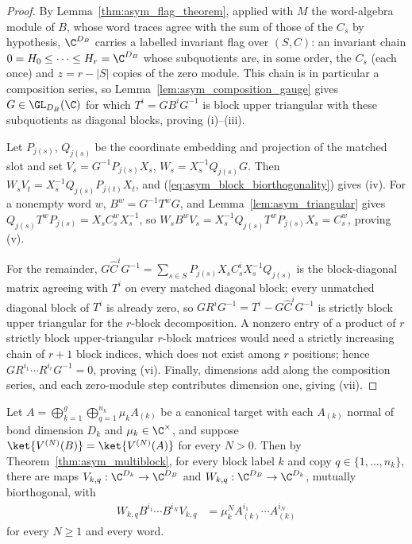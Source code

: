 \begin{proof}
    \leanok
    By Lemma~\ref{thm:asym_flag_theorem}, applied with $M$ the
    word-algebra module of $B$, whose word traces agree with the sum of
    those of the $C_s$ by hypothesis, $\C^{D_B}$ carries a labelled
    invariant flag over $(S,C)$: an invariant chain $0=H_0\leq\cdots\leq
        H_r=\C^{D_B}$ whose subquotients are, in some order, the $C_s$ (each
    once) and $z=r-|S|$ copies of the zero module. This chain is in
    particular a composition series, so Lemma~\ref{lem:asym_composition_gauge}
    gives $G\in\GL_{D_B}(\C)$ for which $T^i=GB^iG^{-1}$ is block upper
    triangular with these subquotients as diagonal blocks, proving (i)--(iii).

    Let $P_{j(s)}$, $Q_{j(s)}$ be the coordinate embedding and projection
    of the matched slot and set $V_s=G^{-1}P_{j(s)}X_s$,
    $W_s=X_s^{-1}Q_{j(s)}G$. Then $W_sV_t=X_s^{-1}Q_{j(s)}P_{j(t)}X_t$, and
    (\ref{eq:asym_block_biorthogonality}) gives (iv). For a nonempty word
    $w$, $B^w=G^{-1}T^wG$, and Lemma~\ref{lem:asym_triangular} gives
    $Q_{j(s)}T^wP_{j(s)}=X_sC_s^wX_s^{-1}$, so
    $W_sB^wV_s=X_s^{-1}Q_{j(s)}T^wP_{j(s)}X_s=C_s^w$, proving (v).

    For the remainder, $G\widehat C^iG^{-1}=\sum_{s\in S}P_{j(s)}X_sC_s^iX_s^{-1}Q_{j(s)}$
    is the block-diagonal matrix agreeing with $T^i$ on every matched
    diagonal block; every unmatched diagonal block of $T^i$ is already
    zero, so $GR^iG^{-1}=T^i-G\widehat C^iG^{-1}$ is strictly block upper
    triangular for the $r$-block decomposition. A nonzero entry of a
    product of $r$ strictly block upper-triangular $r$-block matrices would
    need a strictly increasing chain of $r+1$ block indices, which does not
    exist among $r$ positions; hence $GR^{i_1}\cdots R^{i_r}G^{-1}=0$,
    proving (vi). Finally, dimensions add along the composition series, and
    each zero-module step contributes dimension one, giving (vii).
\end{proof}

\begin{lemma}
    \label{thm:asym_weighted_compression}
    \leanok
    Let $A=\bigoplus_{k=1}^g\bigoplus_{q=1}^{n_k}\mu_kA_{(k)}$ be a
    canonical target with each $A_{(k)}$ normal of bond dimension $D_k$
    and $\mu_k\in\C^\times$, and suppose
    $\ket{V^{(N)}(B)}=\ket{V^{(N)}(A)}$ for every $N>0$. Then by
    Theorem~\ref{thm:asym_multiblock}, for every block label $k$ and copy
    $q\in\{1,\ldots,n_k\}$, there are maps
    $V_{k,q}:\C^{D_k}\to\C^{D_B}$ and $W_{k,q}:\C^{D_B}\to\C^{D_k}$,
    mutually biorthogonal, with
    \begin{align}
        W_{k,q}B^{i_1}\cdots B^{i_N}V_{k,q}
         & =\mu_k^NA_{(k)}^{i_1}\cdots A_{(k)}^{i_N}
        \label{eq:asym_weighted_compression}
    \end{align}
    for every $N\geq1$ and every word.
\end{lemma}

